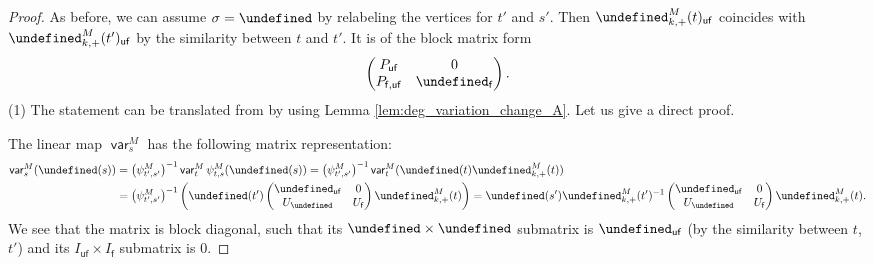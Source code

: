 \documentclass[10pt,a4paper]{amsart}
\newcommand{\opname}[1]{\operatorname{\mathsf{#1}}}
\newcommand{\var}{\opname{var}}
\newcommand{\fv}{\opname{f}}
\newcommand{\ufv}{\opname{uf}}
\let\Iufv\undefined
\let\Id\undefined
\let\trans\undefined
\let\ff\undefined
\let\uff\undefined
\let\low\undefined
\newcommand{\Iufv}{I_{\ufv}}
\newcommand{\Id}{{\opname{Id}}}
\newcommand{\trans}{\opname{P}}
\newcommand{\ff}{\mathbf{f}}
\newcommand{\uff}{\underline{\ff}}
\newcommand{\low}{\opname{\fv,\ufv}}
\numberwithin{equation}{section}
\begin{document}
\begin{proof}
As before, we can assume $\sigma=\Id$ by relabeling the vertices
for $t'$ and $s'$. Then $\trans_{k,+}^{M}(t)_{\ufv}$ coincides
with $\trans_{k,+}^{M}(t')_{\ufv}$ by the similarity between $t$
and $t'$. It is of the block matrix form
\[\begin{pmatrix}
P_{\ufv} & 0\\
P_{\fv,\ufv} & \Id_{\fv}
\end{pmatrix}.\]
(1) The statement can be translated from \cite[Proposition 5.1.6]{qin2020dual}
by using Lemma \ref{lem:deg_variation_change_A}. Let us give a direct
proof.

The linear map $\var_{s}^{M}$ has the following matrix representation:
\begin{align*}
\var_{s}^{M}(\uff(s)) & =\big(\psi_{t',s'}^{M}\big)^{-1}\var_{t}^{M}\psi_{t,s}^{M}(\uff(s))=\big(\psi_{t',s'}^{M}\big)^{-1}\var_{t}^{M}(\uff(t)\trans_{k,+}^{M}(t))\\
 & =\big(\psi_{t',s'}^{M}\big)^{-1}\left(\uff(t')\begin{pmatrix}
\Id_{\ufv} & 0\\
U_{\low} & U_{\fv}
\end{pmatrix}\trans_{k,+}^{M}(t)\right)=\uff(s')\trans_{k,+}^{M}(t')^{-1}\begin{pmatrix}
\Id_{\ufv} & 0\\
U_{\low} & U_{\fv}
\end{pmatrix}\trans_{k,+}^{M}(t).
\end{align*}
We see that the matrix \smash{$\trans_{k,+}^{M}(t')^{-1}\left(\begin{smallmatrix}
\Id_{\ufv} & 0\\
U_{\low} & U_{\fv}
\end{smallmatrix}\right)\trans_{k,+}^{M}(t)$} is block diagonal, such that its $\Iufv\times\Iufv$ submatrix is
$\Id_{\ufv}$ (by the similarity between $t$, $t'$) and its $I_{\ufv}\times I_{\fv}$
submatrix is $0$.


\end{proof}
\end{document}
